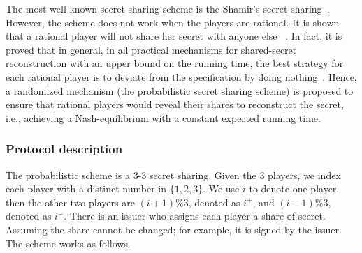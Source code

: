 The most well-known secret sharing scheme is the Shamir's secret sharing~\cite{Shamir79}. However, the scheme does not work when the players are rational. It is shown that a rational player will not share her secret with anyone else ~\cite{HT04}. In fact, it is proved that in general, in all practical mechanisms for shared-secret reconstruction with an upper bound on the running time, the best strategy for each rational player is to deviate from the specification by doing nothing~\cite{HT04}. Hence, a randomized mechanism (the probabilistic secret sharing scheme) is proposed to ensure that rational players would reveal their shares to reconstruct the secret, i.e., achieving a Nash-equilibrium with a constant expected running time. 

\subsubsection{Protocol description}
The probabilistic scheme is a $3\mbox{-}3$ secret sharing. 
Given the $3$ players, we index each player with a distinct number in $\{1, 2, 3\}$. We use $i$ to denote one player, then the other two players are $(i+1)\%3$, denoted as $i^+$, and $(i-1)\%3$, denoted as $i^-$. There is an issuer who assigns each player a share of secret. Assuming the share cannot be changed; for example, it is signed by the issuer.
The scheme works as follows.
